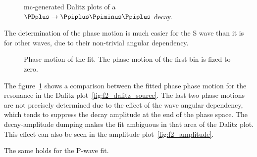     \begin{figure}
        \centering


        \caption{\ac{mc}-generated Dalitz plots of a $\PDplus \to \Ppiplus\Ppiminus\Ppiplus$ decay.}

    \end{figure}

    The determination of the phase motion is much easier for the S wave than it is for other waves, due to their non-trivial angular dependency.
    \begin{figure}
        \centering
        
        \caption{Phase motion of the \Pfii{} fit. The phase motion of the first bin is fized to zero.}
        \label{fig:fit_f2_phase_motion}
    \end{figure}
    The figure~\ref{fig:fit_f2_phase_motion} shows a comparison between the fitted phase phase motion for the \Pfii{} resonance in the Dalitz plot~\ref{fig:f2_dalitz_source}. 
    The last two phase motions are not precisely determined due to the effect of the wave angular dependency, which tends to suppress the decay amplitude at the end of the phase space. 
    The decay-amplitude dumping makes the fit ambiguous in that area of the Dalitz plot.
    This effect can also be seen in the amplitude plot~\ref{fig:f2_amplitude}.


    The same holds for the P-wave \Prhozero{} fit.


    

